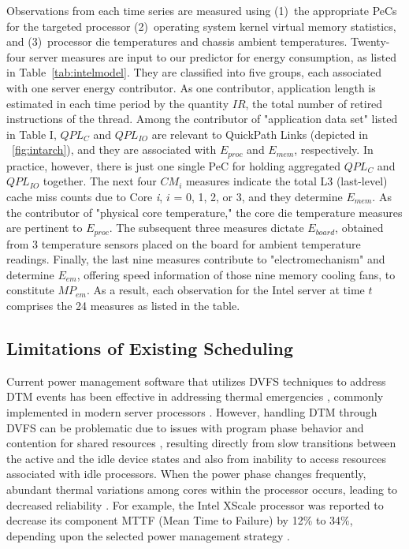 \documentclass[times, 10pt,twocolumn]{IEEEtran}
\begin{document}
Observations from each time series are measured using (1)~the
appropriate PeCs for the targeted processor (2)~operating system kernel
virtual memory statistics, and (3)~processor die temperatures and
chassis ambient temperatures.  Twenty-four server measures are input to
our predictor for energy consumption, as listed in Table~\ref{tab:intelmodel}.
They are classified into five groups, each associated with one server energy
contributor. 
As one contributor, application length is estimated in each time period by the
quantity $IR$, the total number of retired instructions of the thread.  
Among the contributor of "application data set" listed in Table I,
$QPL_{C}$ and $QPL_{IO}$ are relevant to
QuickPath Links (depicted in \figurename~\ref{fig:intarch}), and they
are associated with $E_{proc}$ and $E_{mem}$, respectively.  In
practice, however, there is just one single PeC for holding aggregated
$QPL_{C}$ and $QPL_{IO}$ together.  
The next four $CM_{i}$ measures indicate the total L3 (last-level) cache miss
counts due to Core \textit{i}, $i$ = 0, 1, 2, or 3, and they determine $E_{mem}$.
As the contributor of "physical core temperature,"
the core die temperature measures are pertinent to $E_{proc}$.
The subsequent three measures dictate $E_{board}$, obtained
from 3 temperature sensors placed on the board for ambient temperature readings.
Finally, the last nine measures contribute to "electromechanism"
and determine $E_{em}$, offering speed information of those nine memory
cooling fans, to constitute $MP_{em}$.  As a result, each observation
for the Intel server at time $t$ comprises the 24 measures as listed in the table.

\subsection{Limitations of Existing Scheduling}
\label{sec:shortc-comp-workl}
Current power management software that utilizes DVFS techniques to address DTM
events has been effective in addressing thermal emergencies
\cite{Donald2006,Hanson2007}, commonly implemented in modern server
processors \cite{AMD2007,Intel2009}.
However, handling DTM through DVFS can be problematic due to issues with
program phase behavior and contention for shared resources
\cite{Bircher2008,Coskun2008d}, resulting directly from
slow transitions between the active and the idle device states
and also from inability to access resources associated with idle processors.
When the power phase changes frequently, abundant thermal variations among cores
within the processor occurs, leading to decreased reliability \cite{Rosing2007,Coskun2008d,Kursun2009}.
For example, the Intel XScale processor was reported to decrease
its component MTTF (Mean Time to Failure) by 12\% to 34\%,
depending upon the selected power management strategy \cite{Rosing2007}. 
\end{document}
